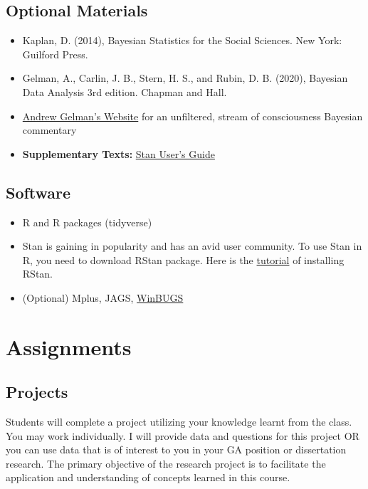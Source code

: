 \documentclass[
  letterpaper,
  DIV=11,
  numbers=noendperiod]{scrartcl}
\providecommand{\tightlist}{%
  \setlength{\itemsep}{0pt}\setlength{\parskip}{0pt}}\usepackage{longtable,booktabs,array}
\begin{document}
\hypertarget{optional-materials}{%
\subsection{Optional Materials}\label{optional-materials}}

\begin{itemize}
\tightlist
\item
  Kaplan, D. (2014), Bayesian Statistics for the Social Sciences. New
  York: Guilford Press.
\item
  Gelman, A., Carlin, J. B., Stern, H. S., and Rubin, D. B. (2020),
  Bayesian Data Analysis 3rd edition. Chapman and Hall.
\item
  \href{http://andrewgelman.com}{Andrew Gelman's Website} for an
  unfiltered, stream of consciousness Bayesian commentary
\item
  \textbf{Supplementary Texts:}
  \href{https://mc-stan.org/docs/2_33/stan-users-guide-2_33.pdf}{Stan
  User's Guide}
\end{itemize}

\hypertarget{software}{%
\subsection{Software}\label{software}}

\begin{itemize}
\tightlist
\item
  R and R packages (tidyverse)
\item
  Stan is gaining in popularity and has an avid user community. To use
  Stan in R, you need to download RStan package. Here is the
  \href{https://github.com/stan-dev/rstan/wiki/RStan-Getting-Started}{tutorial}
  of installing RStan.
\item
  (Optional) Mplus, JAGS,
  \href{http://www.mrc-bsu.cam.ac.uk/software/bugs/the-bugs-project-winbugs/}{WinBUGS}
\end{itemize}

\hypertarget{assignments}{%
\section{Assignments}\label{assignments}}

\hypertarget{projects}{%
\subsection{Projects}\label{projects}}

Students will complete a project utilizing your knowledge learnt from
the class. You may work individually. I will provide data and questions
for this project OR you can use data that is of interest to you in your
GA position or dissertation research. The primary objective of the
research project is to facilitate the application and understanding of
concepts learned in this course.
\end{document}
